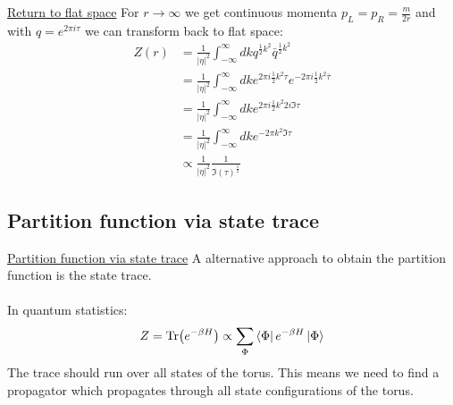 \documentclass[11pt,aspectratio=169]{beamer}
\begin{document}
\begin{frame}{\underline{Return to flat space}}
	For $r \rightarrow \infty$ we get continuous momenta $p_L = p_R = \frac{m}{2r}$ and with $q = e^{2\pi i \tau}$ we can transform back to flat space:
	\begin{align*}
		Z(r) &= \frac{1}{|\eta|^2} \int_{-\infty}^{\infty}dk q^{\frac{1}{2}k^2}\bar{q}^{\frac{1}{2}k^2} \\
		&= \frac{1}{|\eta|^2} \int_{-\infty}^{\infty}dk e^{2\pi i \frac{1}{2}k^2 \tau}e^{-2\pi i \frac{1}{2}k^2 \bar{\tau}} \\
		&= \frac{1}{|\eta|^2} \int_{-\infty}^{\infty}dk e^{2\pi i \frac{1}{2}k^2 2 i \Im{\tau}} \\
		&= \frac{1}{|\eta|^2} \int_{-\infty}^{\infty}dk e^{-2\pi k^2 \Im{\tau}} \\
		&\propto \frac{1}{|\eta|^2} \frac{1}{\Im(\tau)^{\frac{1}{2}}}
	\end{align*}
	
\end{frame}









\subsection{Partition function via state trace}

\begin{frame}{\underline{Partition function via state trace}}
	A alternative approach to obtain the partition function is the state trace.
	\\~\\
	In quantum statistics:
	\begin{equation}
		Z = \Tr(e^{-\beta H}) \propto \sum_{\Phi}\bra{\Phi} e^{-\beta H} \ket{\Phi}
	\end{equation}
	The trace should run over all states of the torus. This means we need to find a propagator 
	which propagates through all state configurations of the torus.
	

\end{frame}
\end{document}
